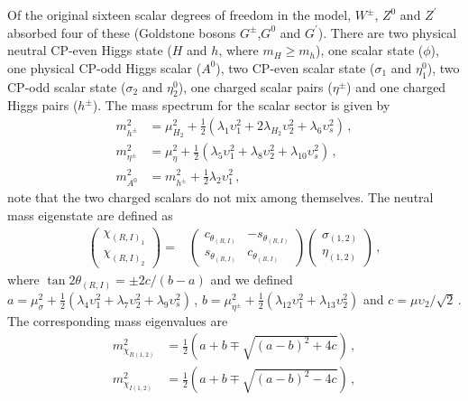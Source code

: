 \documentclass[12pt]{article}
\begin{document}
Of the original sixteen scalar degrees of freedom in the model, $W^{\pm}$, $Z^{0}$ and $Z^{\prime}$ absorbed four of these (Goldstone bosons $G^{\pm}$,$G^{0}$ and $G^{\prime}$). There are two physical neutral CP-even Higgs state ($H$ and $h$, where $m_{H} \geq m_{h}$), one scalar state ($\phi$), one physical CP-odd Higgs scalar ($A^{0}$), two CP-even scalar state ($\sigma_{1}$ and $\eta^{0}_{1}$), two CP-odd scalar state ($\sigma_{2}$ and $\eta^{0}_{2}$), one charged scalar pairs ($\eta^{\pm}$) and one charged Higgs pairs ($h^{\pm}$). The mass spectrum for the scalar sector is given by
\begin{align*}
    m_{h^{\pm}}^{2} &= \mu^{2}_{H_{2}} + \frac{1}{2}(\lambda_{1} \upsilon^{2}_{1} + 2\lambda_{H_{2}} \upsilon^{2}_{2} + \lambda_{6} \upsilon^{2}_{s})\,, \\
    m_{\eta^{\pm}}^{2} &= \mu_{\eta}^{2} + \frac{1}{2} (\lambda_{5} \upsilon^{2}_{1} + \lambda_{8} \upsilon^{2}_{2} + \lambda_{10} \upsilon^{2}_{s} )\,, \\
    m_{A^{0}}^{2} &= m_{h^{\pm}}^{2} + \frac{1}{2} \lambda_{2} \upsilon^{2}_{1} \,,
\end{align*}
%
note that the two charged scalars do not mix among themselves. The neutral mass eigenstate are defined as
%
\begin{align*}
    \begin{pmatrix}\chi_{(R,I)_{1}} \\ \chi_{(R,I)_{2}} \end{pmatrix} =& \begin{pmatrix} c_{\theta_{(R,I)}} & -s_{\theta_{(R,I)}} \\ s_{\theta_{(R,I)}} & c_{\theta_{(R,I)}} \end{pmatrix} \begin{pmatrix}\sigma_{(1,2)} \\ \eta_{(1,2)} \end{pmatrix} \,,
\end{align*}
%
where $\tan2\theta_{(R,I)} = \pm2c/(b-a)$ and we defined $a = \mu^{2}_{\sigma}+\frac{1}{2}(\lambda_{4} \upsilon^{2}_{1} + \lambda_{7} \upsilon^{2}_{2} + \lambda_{9} \upsilon^{2}_{s})$\,,
$b = \mu^{2}_{\eta^{\pm}} + \frac{1}{2}(\lambda_{12} \upsilon^{2}_{1} + \lambda_{13} \upsilon^{2}_{2})$ and $c = \mu \upsilon_{2}/\sqrt{2}$\,. The corresponding mass eigenvalues are
\begin{align*}
    m_{\chi_{R(1,2)}}^{2} &= \frac{1}{2} \left(a + b \mp \sqrt{(a-b)^{2} + 4c} \right)\,, \\
     m_{\chi_{I(1,2)}}^{2} &= \frac{1}{2} \left(a + b \mp \sqrt{(a-b)^{2} - 4c} \right)\,,
\end{align*}
\end{document}
